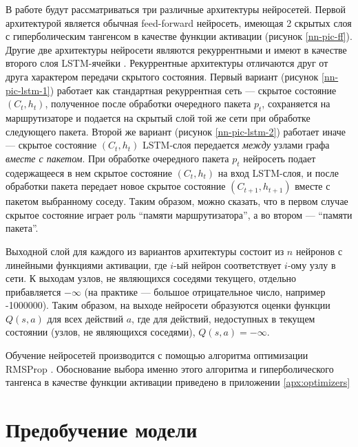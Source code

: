 \documentclass[specification, annotation]{itmo-student-thesis}
\begin{document}
В работе будут рассматриваться три различные архитектуры нейросетей. Первой
архитектурой является обычная feed-forward нейросеть, имеющая 2 скрытых слоя с
гиперболическим тангенсом в качестве функции активации (рисунок
\ref{nn-pic-ff}). Другие две архитектуры нейросети
являются рекуррентными и имеют в качестве второго слоя
LSTM-ячейки \cite{hochreiter1997long}. Рекуррентные
архитектуры отличаются друг от друга характером передачи скрытого состояния.
Первый вариант (рисунок \ref{nn-pic-lstm-1}) работает как стандартная
рекуррентная сеть --- скрытое состояние $(C_t, h_t)$, полученное после обработки
очередного пакета $p_t$, сохраняется на маршрутизаторе и подается на скрытый
слой той же сети при обработке следующего пакета. Второй же вариант (рисунок
\ref{nn-pic-lstm-2}) работает иначе --- скрытое состояние $(C_t, h_t)$ LSTM-слоя
передается \textit{между} узлами графа \textit{вместе с пакетом}. При обработке
очередного пакета $p_t$ нейросеть подает содержащееся в нем скрытое состояние
$(C_t, h_t)$ на вход LSTM-слоя, и после обработки пакета передает новое скрытое
состояние $(C_{t+1}, h_{t+1})$ вместе с пакетом выбранному соседу. Таким
образом, можно сказать, что в первом случае скрытое состояние играет роль
\enquote{памяти маршрутизатора}, а во втором --- \enquote{памяти пакета}.

Выходной слой для каждого из вариантов архитектуры состоит из $n$
нейронов с линейными функциями активации, где $i$-ый нейрон
соответствует $i$-ому узлу в сети. К выходам узлов, не являющихся соседями
текущего, отдельно прибавляется $-\infty$ (на практике --- большое отрицательное
число, например -1000000). Таким образом, на выходе нейросети образуются оценки
функции $Q(s, a)$ для всех действий $a$, где для действий, недоступных в текущем
состоянии (узлов, не являющихся соседями), $Q(s, a) = -\infty$.

Обучение нейросетей производится с помощью алгоритма оптимизации
RMSProp \cite{tieleman2012lecture}. Обоснование выбора именно этого алгоритма и
гиперболического тангенса в качестве функции активации приведено в приложении
\ref{apx:optimizers}

\section{Предобучение модели}
\end{document}

